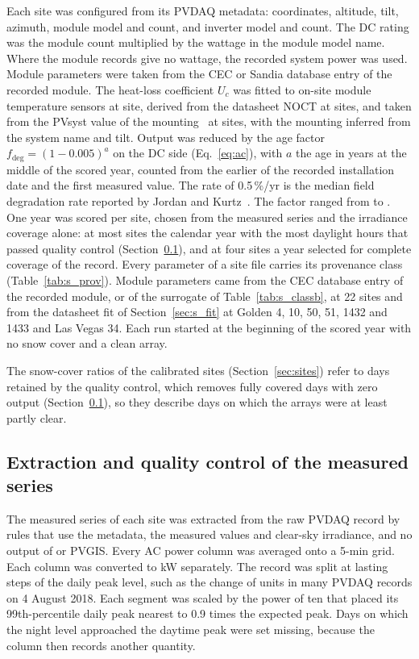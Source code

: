 \documentclass[11pt]{article}
\begin{document}
Each site was configured from its PVDAQ metadata: coordinates, altitude, tilt, azimuth, module model and count, and inverter model and count. The DC rating was the module count multiplied by the wattage in the module model name. Where the module records give no wattage, the recorded system power was used. Module parameters were taken from the CEC or Sandia database entry of the recorded module. The heat-loss coefficient $U_c$ was fitted to on-site module temperature sensors at \vUcFit{} site, derived from the datasheet NOCT at \vUcNoct{} sites, and taken from the PVsyst value of the mounting~\cite{pvsystUvalueMeasurement2026} at \vUcClass{} sites, with the mounting inferred from the system name and tilt. Output was reduced by the age factor $f_{\mathrm{deg}}=(1-0.005)^{a}$ on the DC side (Eq.~\ref{eq:ac}), with $a$ the age in years at the middle of the scored year, counted from the earlier of the recorded installation date and the first measured value. The rate of 0.5\,\%/yr is the median field degradation rate reported by Jordan and Kurtz~\cite{jordanKurtz2013degradation}. The factor ranged from \vDegMin{} to \vDegMax. One year was scored per site, chosen from the measured series and the irradiance coverage alone: at most sites the calendar year with the most daylight hours that passed quality control (Section~\ref{sec:s_qc_extract}), and at four sites a year selected for complete coverage of the record. Every parameter of a site file carries its provenance class (Table~\ref{tab:s_prov}). Module parameters came from the CEC database entry of the recorded module, or of the surrogate of Table~\ref{tab:s_classb}, at 22 sites and from the datasheet fit of Section~\ref{sec:s_fit} at Golden 4, 10, 50, 51, 1432 and 1433 and Las Vegas 34. Each run started at the beginning of the scored year with no snow cover and a clean array.

The snow-cover ratios of the calibrated sites (Section~\ref{sec:sites}) refer to days retained by the quality control, which removes fully covered days with zero output (Section~\ref{sec:s_qc_extract}), so they describe days on which the arrays were at least partly clear.

\subsection{Extraction and quality control of the measured series}
\label{sec:s_qc_extract}

The measured series of each site was extracted from the raw PVDAQ record by rules that use the metadata, the measured values and clear-sky irradiance, and no output of \RePV{} or PVGIS. Every AC power column was averaged onto a 5-min grid. Each column was converted to kW separately. The record was split at lasting steps of the daily peak level, such as the change of units in many PVDAQ records on 4 August 2018. Each segment was scaled by the power of ten that placed its 99th-percentile daily peak nearest to 0.9 times the expected peak. Days on which the night level approached the daytime peak were set missing, because the column then records another quantity.
\end{document}
